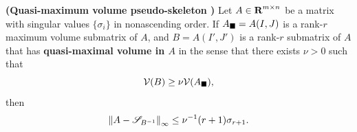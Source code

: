 \documentclass{article}
\begin{document}
	\begin{thm} \textnormal{\bf(Quasi-maximum volume pseudo-skeleton \cite{olshevsky_2001})}
		\label{thm:quasi-maximum_volume_pseudo-skeleton}
		Let $A \in \textnormal{\bf R}^{m\times n}$ be a matrix with singular values $\{\sigma_i\}$ in nonascending order. If $A_\blacksquare = A(I,J)$ is a rank-$r$ maximum volume submatrix of $A$, and $B = A(I', J')$ is a rank-$r$ submatrix of $A$ that has \textbf{quasi-maximal volume in $A$} in the sense that there exists $\nu > 0$ such that
		\begin{equation}
			\mathcal{V}(B) \ge \nu \mathcal{V}(A_\blacksquare),
		\end{equation}
		then
		\begin{equation}
			\left\lVert A - \mathscr{S}_{B^{-1}} \right\rVert_\infty \le \nu^{-1}(r+1)\sigma_{r+1}.
		\end{equation}
	\end{thm}
	
\end{document}
